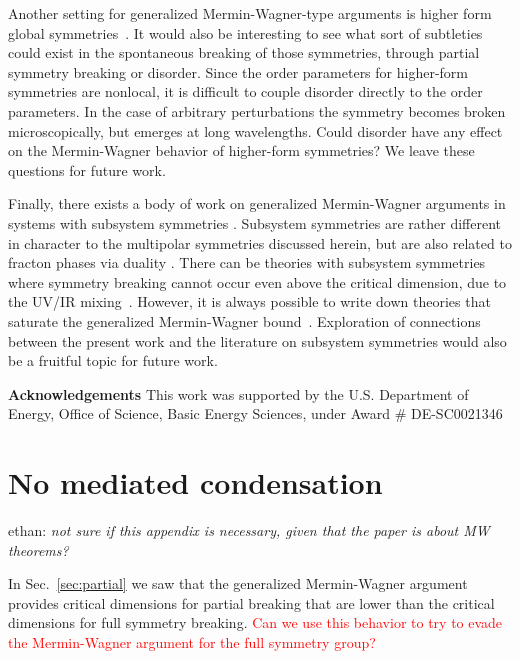 \documentclass[pra,aps,twocolumn, amsfonts,amsmath,amssymb,nofootinbib,superscriptaddress]{revtex4-2}
\newcommand{\note}[1]{\textcolor{red}{#1}}
\newcommand{\ethan}[1]{ { \color{blue} \footnotesize \textsf{ethan: \textsl{#1}} }}
\providecommand{\DIFaddtex}[1]{{\protect\color{blue}\uwave{#1}}} %
\providecommand{\DIFaddbegin}{} %
\providecommand{\DIFaddend}{} %
\providecommand{\DIFadd}[1]{\texorpdfstring{\DIFaddtex{#1}}{#1}} %
\newcommand{\DIFaddincludegraphics}[2][]{{\color{blue}\fbox{\DIFOincludegraphics[#1]{#2}}}} %
\DeclareRobustCommand{\DIFaddbegin}{\DIFOaddbegin \let\includegraphics\DIFaddincludegraphics} %
\DeclareRobustCommand{\DIFaddend}{\DIFOaddend \let\includegraphics\DIFOincludegraphics} %
\begin{document}
Another setting for generalized Mermin-Wagner-type arguments is higher form global symmetries~\cite{GKSW, Lake, Marvin}. It would also be interesting to see what sort of subtleties could exist in the spontaneous breaking of those symmetries, through partial symmetry breaking or disorder. Since the order parameters for higher-form symmetries are nonlocal, it is difficult to couple disorder directly to the order parameters. In the case of arbitrary perturbations the symmetry becomes broken microscopically, but emerges at long wavelengths. Could disorder have any effect on the Mermin-Wagner behavior of higher-form symmetries? We leave these questions for future work. 

Finally, there exists a body of work on generalized Mermin-Wagner arguments in systems with subsystem symmetries \cite{Batista2005, SeibergA, SeibergB, SeibergC, Gorantla2021, Distler2021}. Subsystem symmetries are rather different in character to the multipolar symmetries discussed herein, but are also related to fracton phases via duality \cite{VHF2}. There can be theories with subsystem symmetries where symmetry breaking cannot occur even above the critical dimension, due to the UV/IR mixing~\cite{Gorantla2021}. However, it is always possible to write down theories that saturate the generalized Mermin-Wagner bound~\cite{Distler2021}.
Exploration of connections between the present work and the literature on subsystem symmetries would also be a fruitful topic for future work. 

{\bf Acknowledgements} This work was supported by
the U.S. Department of Energy, Office of Science, Basic
Energy Sciences, under Award \# DE-SC0021346\DIFaddbegin \DIFadd{. EL was supported by the Hertz Fellowship. 
}\DIFaddend 




\appendix

\section{No mediated condensation} \label{app:mediated}
\DIFaddbegin 

\ethan{not sure if this appendix is necessary, given that the paper is about MW theorems?} 
\DIFaddend 

In Sec.~\ref{sec:partial} we saw that the generalized Mermin-Wagner argument provides critical dimensions for partial breaking that are lower than the critical dimensions for full symmetry breaking. \note{Can we use this behavior to try to evade the Mermin-Wagner argument for the full symmetry group?}
\end{document}
